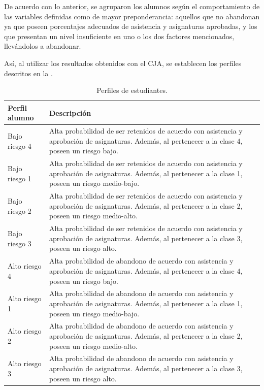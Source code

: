 \documentclass[portuguese]{textolivre}
\begin{document}
De acuerdo con lo anterior, se agruparon los alumnos según el comportamiento de las variables definidas como de mayor preponderancia: aquellos que no abandonan ya que poseen porcentajes adecuados de asistencia y asignaturas aprobadas, y los que presentan un nivel insuficiente en uno o los dos factores mencionados, llevándolos a abandonar.

Así, al utilizar los resultados obtenidos con el CJA, se establecen los perfiles descritos en la .

\begin{table}[htbp]
    \caption{Perfiles de estudiantes.}
    \label{Tabla 7}
    \centering
    \begin{tabular}{lp{9cm}}
    \toprule
    Perfil alumno & Descripción\\
    \midrule
    Bajo riesgo 4 & Alta probabilidad de ser retenidos de acuerdo con asistencia y aprobación de asignaturas. Además, al pertenecer a la clase 4, poseen un riesgo bajo.\\
    Bajo riesgo 1 & Alta probabilidad de ser retenidos de acuerdo con asistencia y aprobación de asignaturas. Además, al pertenecer a la clase 1, poseen un riesgo medio-bajo.\\
    Bajo riesgo 2 & Alta probabilidad de ser retenidos de acuerdo con asistencia y aprobación de asignaturas. Además, al pertenecer a la clase 2, poseen un riesgo medio-alto.\\
    Bajo riesgo 3 & Alta probabilidad de ser retenidos de acuerdo con asistencia y aprobación de asignaturas. Además, al pertenecer a la clase 3, poseen un riesgo alto.\\
    Alto riesgo 4 & Alta probabilidad de abandono de acuerdo con asistencia y aprobación de asignaturas. Además, al pertenecer a la clase 4, poseen un riesgo bajo.\\
    Alto riesgo 1 & Alta probabilidad de abandono de acuerdo con asistencia y aprobación de asignaturas. Además, al pertenecer a la clase 1, poseen un riesgo medio-bajo.\\
    Alto riesgo 2 & Alta probabilidad de abandono de acuerdo con asistencia y aprobación de asignaturas. Además, al pertenecer a la clase 2, poseen un riesgo medio-alto.\\
    Alto riesgo 3 & Alta probabilidad de abandono de acuerdo con asistencia y aprobación de asignaturas. Además, al pertenecer a la clase 3, poseen un riesgo alto.\\
    \bottomrule
    \end{tabular}
\end{table}
\end{document}
